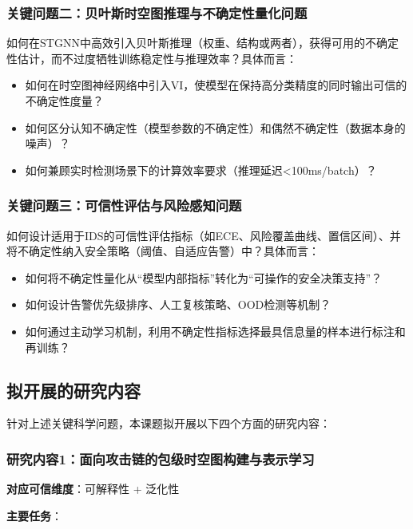 \subsubsection{关键问题二：贝叶斯时空图推理与不确定性量化问题}

如何在STGNN中高效引入贝叶斯推理（权重、结构或两者），获得可用的不确定性估计，而不过度牺牲训练稳定性与推理效率？具体而言：

\begin{itemize}
  \item 如何在时空图神经网络中引入VI，使模型在保持高分类精度的同时输出可信的不确定性度量？
  \item 如何区分认知不确定性（模型参数的不确定性）和偶然不确定性（数据本身的噪声）？
  \item 如何兼顾实时检测场景下的计算效率要求（推理延迟<100ms/batch）？
\end{itemize}

\subsubsection{关键问题三：可信性评估与风险感知问题}

如何设计适用于IDS的可信性评估指标（如ECE、风险覆盖曲线、置信区间）、并将不确定性纳入安全策略（阈值、自适应告警）中？具体而言：

\begin{itemize}
  \item 如何将不确定性量化从``模型内部指标''转化为``可操作的安全决策支持''？
  \item 如何设计告警优先级排序、人工复核策略、OOD检测等机制？
  \item 如何通过主动学习机制，利用不确定性指标选择最具信息量的样本进行标注和再训练？
\end{itemize}

\subsection{拟开展的研究内容}

针对上述关键科学问题，本课题拟开展以下四个方面的研究内容：

\subsubsection{研究内容1：面向攻击链的包级时空图构建与表示学习}

\textbf{对应可信维度}：可解释性 + 泛化性

\textbf{主要任务}：


